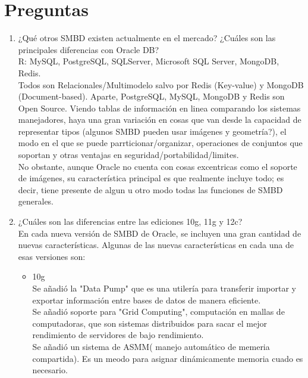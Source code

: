 \documentclass[10pt]{article}
\begin{document}
	\section{Preguntas}
	\begin{enumerate}
		\item ¿Qué otros SMBD existen actualmente en el mercado? ¿Cuáles son las principales diferencias con Oracle DB?\\
		R: MySQL, PostgreSQL, SQLServer, Microsoft SQL Server, MongoDB, Redis.\\
		Todos son Relacionales/Multimodelo salvo por Redis (Key-value) y MongoDB
		(Document-based).
		Aparte, PostgreSQL, MySQL, MongoDB y Redis son Open Source.
		Viendo tablas de información en linea comparando los sistemas manejadores, haya
		una gran variación en cosas que van desde la capacidad de representar tipos
		(algunos SMBD pueden usar imágenes y geometría?), el modo en el que se puede
		parrticionar/organizar, operaciones de conjuntos que soportan y otras ventajas en
		seguridad/portabilidad/limites.\\ 
		No obstante, aunque Oracle no cuenta con cosas excentricas como el soporte de
		imágenes, su característica principal es que realmente incluye todo; es decir, tiene
		presente de algun u otro modo todas las funciones de SMBD generales.
		
        \item ¿Cuáles son las diferencias entre las ediciones 10g, 11g y 12c?\\
		En cada nueva versión de SMBD de Oracle, se incluyen una gran cantidad
		de nuevas características. Algunas de las nuevas características en 
		cada una de esas versiones son: 
		\begin{itemize}
			\item {
				10g \\
				Se añadió la "Data Pump" que es una utilería para transferir
				importar y exportar información entre bases de datos de manera 
				eficiente. \\
				Se añadió soporte para "Grid Computing", computación en mallas
				de computadoras, que son sistemas distribuidos para sacar el 
				mejor rendimiento de servidores de bajo rendimiento. \\
				Se añadió un sistema de ASMM( manejo automático de memeria 
				compartida). Es un meodo para asignar dinámicamente memoria
				cuado es necesario.

}
\end{itemize}
\end{enumerate}
\end{document}

